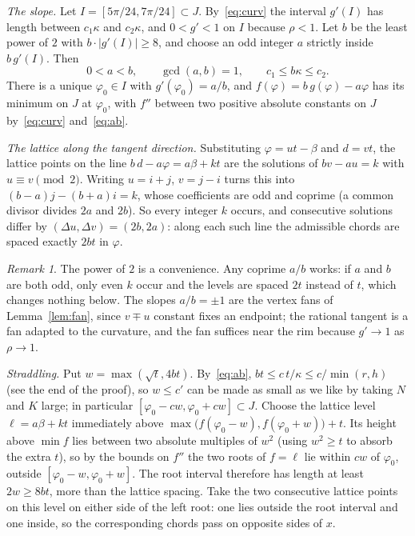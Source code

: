 \documentclass[11pt]{amsart}
\theoremstyle{remark}
\newtheorem{remark}[theorem]{Remark}
\begin{document}
\emph{The slope.} Let $I=[5\pi/24,7\pi/24]\subset J$. By~\eqref{eq:curv} the interval $g'(I)$ has length between $c_1\kappa$ and $c_2\kappa$, and $0<g'<1$ on $I$ because $\rho<1$. Let $b$ be the least power of $2$ with $b\cdot|g'(I)|\ge8$, and choose an odd integer $a$ strictly inside $b\,g'(I)$. Then
\begin{equation}\label{eq:ab}
0<a<b,\qquad\gcd(a,b)=1,\qquad c_1\le b\kappa\le c_2 .
\end{equation}
There is a unique $\varphi_0\in I$ with $g'(\varphi_0)=a/b$, and $f(\varphi)=b\,g(\varphi)-a\varphi$ has its minimum on $J$ at $\varphi_0$, with $f''$ between two positive absolute constants on $J$ by~\eqref{eq:curv} and~\eqref{eq:ab}.

\emph{The lattice along the tangent direction.} Substituting $\varphi=ut-\beta$ and $d=vt$, the lattice points on the line $b\,d-a\varphi=a\beta+kt$ are the solutions of $bv-au=k$ with $u\equiv v\pmod2$. Writing $u=i+j$, $v=j-i$ turns this into $(b-a)j-(b+a)i=k$, whose coefficients are odd and coprime (a common divisor divides $2a$ and $2b$). So every integer $k$ occurs, and consecutive solutions differ by $(\Delta u,\Delta v)=(2b,2a)$: along each such line the admissible chords are spaced exactly $2bt$ in $\varphi$.

\begin{remark}
The power of $2$ is a convenience. Any coprime $a/b$ works: if $a$ and $b$ are both odd, only even $k$ occur and the levels are spaced $2t$ instead of $t$, which changes nothing below. The slopes $a/b=\pm1$ are the vertex fans of Lemma~\ref{lem:fan}, since $v\mp u$ constant fixes an endpoint; the rational tangent is a fan adapted to the curvature, and the fan suffices near the rim because $g'\to1$ as $\rho\to1$.
\end{remark}

\emph{Straddling.} Put $w=\max(\sqrt t,4bt)$. By~\eqref{eq:ab}, $bt\le c\,t/\kappa\le c/\min(r,h)$ (see the end of the proof), so $w\le c'$ can be made as small as we like by taking $N$ and $K$ large; in particular $[\varphi_0-c w,\varphi_0+c w]\subset J$. Choose the lattice level $\ell=a\beta+kt$ immediately above $\max\bigl(f(\varphi_0-w),f(\varphi_0+w)\bigr)+t$. Its height above $\min f$ lies between two absolute multiples of $w^2$ (using $w^2\ge t$ to absorb the extra $t$), so by the bounds on $f''$ the two roots of $f=\ell$ lie within $cw$ of $\varphi_0$, outside $[\varphi_0-w,\varphi_0+w]$. The root interval therefore has length at least $2w\ge8bt$, more than the lattice spacing. Take the two consecutive lattice points on this level on either side of the left root: one lies outside the root interval and one inside, so the corresponding chords pass on opposite sides of $x$.
\end{document}
